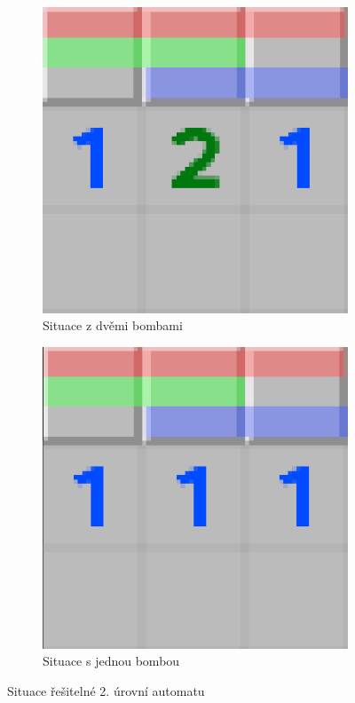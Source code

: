 \begin{figure}[hb!]
    \centering
    \begin{subfigure}[b]{0.3\textwidth}
        \centering
        \includegraphics[scale=0.25]{images/uroven2-2.png}
        \caption{Situace z dvěmi bombami}
        \label{fig:situace_u2_dva}
    \end{subfigure}
    \begin{subfigure}[b]{0.3\textwidth}
        \centering
        \includegraphics[scale=0.25]{images/uroven2-1.png}
        \caption{Situace s jednou bombou}
        \label{fig:situace_u2_jedna}
    \end{subfigure}
    \caption{Situace řešitelné 2. úrovní automatu}
    \label{fig:sitauce_u2}
\end{figure}

